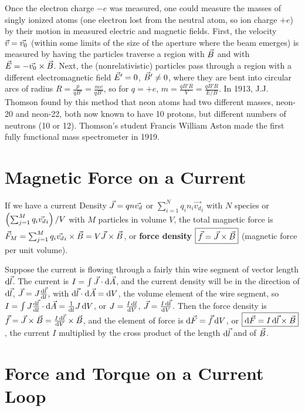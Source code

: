 Once the electron charge $-e$ was measured, one could measure the masses of singly ionized atoms (one electron lost from the neutral atom, so ion charge $+e$) by their motion in measured electric and magnetic fields. First, the velocity $\vec{v} = \vec{v_0}$ (within some limits of the size of the aperture where the beam emerges) is measured by having the particles traverse a region with $\vec{B}$ and with $\vec{E} = -\vec{v_0}\times\vec{B}$. Next, the (nonrelativistic) particles pass through a region with a different electromagnetic field $\vec{E}'=0$, $\vec{B}' \neq 0$, where they are bent into circular arcs of radius $R = \frac{p}{qB'} = \frac{mv}{qB'}$, so for $q = +e$, $m = \frac{qB'R}{V} = \frac{qB'R}{E/B}$. In 1913, J.J. Thomson found by this method that neon atoms had two different masses, neon-20 and neon-22, both now known to have 10 protons, but different numbers of neutrons (10 or 12). Thomson's student Francis William Aston made the first fully functional mass spectrometer in 1919.

\section{Magnetic Force on a Current}

If we have a current Density $\vec{J} = qn\vec{v_d}$ or $\sum_{i=1}^{N}q_i n_i \vec{v_d}_i$ with $N$ species or $\left( \sum_{j=1}^{M}q_i \vec{v_d}_i \right)/V$ with $M$ particles in volume $V$, the total magnetic force is $\vec{F}_M = \sum_{j=1}^{M}q_i \vec{v_d}_i \times \vec{B} = V\vec{J} \times \vec{B}$, or \textbf{force density} $\boxed{ \vec{f} = \vec{J} \times \vec{B} }$ (magnetic force per unit volume).

Suppose the current is flowing through a fairly thin wire segment of vector length $\operatorname{d\!} \vec{l}$. The current is $I = \int \vec{J} \cdot \operatorname{d\!} \vec{A}$, and the current density will be in the direction of $\operatorname{d\!} \vec{l}$, $\vec{J} = J\frac{\operatorname{d\!} \vec{l}}{\operatorname{d\!} l}$, with $\operatorname{d\!} \vec{l} \cdot \operatorname{d\!} \vec{A} = \operatorname{d\!} V$, the volume element of the wire segment, so $I = \int J \frac{\operatorname{d\!} \vec{l}}{\operatorname{d\!} l} \cdot \operatorname{d\!} \vec{A} = \frac{1}{\operatorname{d\!} l} J \operatorname{d\!} V$, or $J = \frac{I \operatorname{d\!} l}{\operatorname{d\!} V}$, $\vec{J} = \frac{I \operatorname{d\!} \vec{l}}{\operatorname{d\!} V}$. Then the force density is $\vec{f} = \vec{J} \times \vec{B} = \frac{I \operatorname{d\!} \vec{l}}{\operatorname{d\!} V} \times \vec{B}$, and the element of force is $\operatorname{d\!} \vec{F} = \vec{f} \operatorname{d\!} V$, or $\boxed{ \operatorname{d\!} \vec{F} = I \operatorname{d\!} \vec{l} \times \vec{B} }$, the current $I$ multiplied by the cross product of the length $\operatorname{d\!} \vec{l}$ and of $\vec{B}$.

\section{Force and Torque on a Current Loop}


